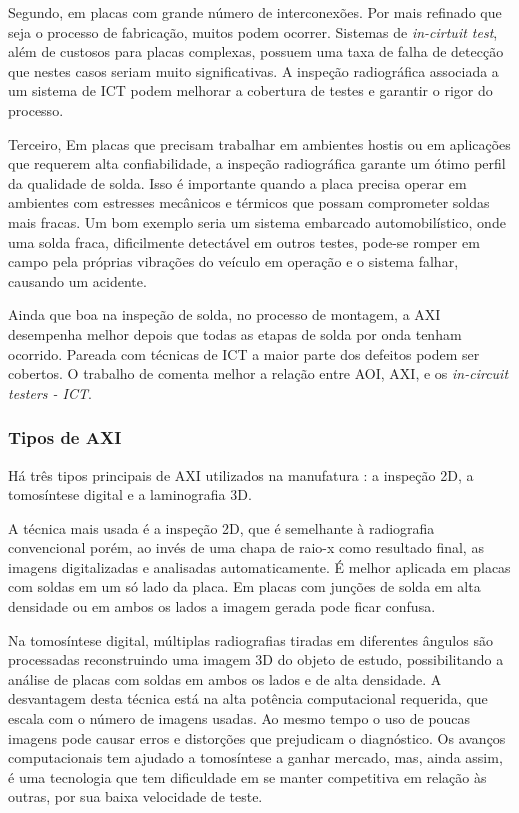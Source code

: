 Segundo, em placas com grande número de interconexões. Por mais refinado que seja o processo de fabricação, muitos  podem ocorrer. Sistemas de \textit{in-cirtuit test}, além de custosos para placas complexas, possuem uma taxa de falha de detecção que nestes casos seriam muito significativas. A inspeção radiográfica associada a um sistema de ICT podem melhorar a cobertura de testes e garantir o rigor do processo.

Terceiro, Em placas que precisam trabalhar em ambientes hostis ou em aplicações que requerem alta confiabilidade, a inspeção radiográfica garante um ótimo perfil da qualidade de solda. Isso é importante quando a placa precisa operar em ambientes com estresses mecânicos e térmicos que possam comprometer soldas mais fracas. Um bom exemplo seria um sistema embarcado automobilístico, onde uma solda fraca, dificilmente detectável em outros testes, pode-se romper em campo pela próprias vibrações do veículo em operação e o sistema falhar, causando um acidente.

Ainda que boa na inspeção de solda, no processo de montagem, a AXI desempenha melhor depois que todas as etapas de solda por onda tenham ocorrido. Pareada com técnicas de ICT a maior parte dos defeitos podem ser cobertos. O trabalho de \citet{oresjo2002use} comenta melhor a relação entre AOI, AXI, e os \textit{in-circuit testers - ICT}.

\subsubsection{Tipos de AXI}

 Há três tipos principais de AXI utilizados na manufatura \citep{dougmcclure2000}: a inspeção 2D, a tomosíntese digital e a laminografia 3D. 

A técnica mais usada é a inspeção 2D, que é semelhante à radiografia convencional porém, ao invés de uma chapa de raio-x como resultado final, as imagens digitalizadas e analisadas automaticamente. É melhor aplicada em placas com soldas em um só lado da placa. Em placas com junções de solda em alta densidade ou em ambos os lados a imagem gerada pode ficar confusa. 

Na tomosíntese digital, múltiplas radiografias tiradas em diferentes ângulos são processadas reconstruindo uma imagem 3D do objeto de estudo, possibilitando a análise de placas com soldas em ambos os lados e de alta densidade. A desvantagem desta técnica está na alta potência computacional requerida, que escala com o número de imagens usadas. Ao mesmo tempo o uso de poucas imagens pode causar erros e distorções que prejudicam o diagnóstico. Os avanços computacionais tem ajudado a tomosíntese a ganhar mercado, mas, ainda assim, é uma tecnologia que tem dificuldade em se manter competitiva em relação às outras, por sua baixa velocidade de teste.

